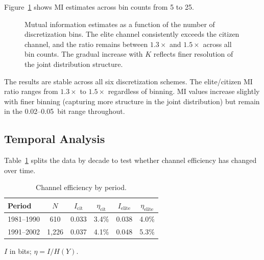 \documentclass[twocolumn,10pt]{article}
\begin{document}
Figure~\ref{fig:sensitivity} shows MI estimates across bin counts from 5 to 25.

\begin{figure}[t]
\centering
{}
\caption{Mutual information estimates as a function of the number of discretization bins.  The elite channel consistently exceeds the citizen channel, and the ratio remains between $1.3\times$ and $1.5\times$ across all bin counts.  The gradual increase with $K$ reflects finer resolution of the joint distribution structure.}
\label{fig:sensitivity}
\end{figure}

The results are stable across all six discretization schemes.  The elite/citizen MI ratio ranges from $1.3\times$ to $1.5\times$ regardless of binning.  MI values increase slightly with finer binning (capturing more structure in the joint distribution) but remain in the 0.02--0.05~bit range throughout.

\subsection{Temporal Analysis}

Table~\ref{tab:temporal} splits the data by decade to test whether channel efficiency has changed over time.

\begin{table}[t]
\centering
\caption{Channel efficiency by period.}
\label{tab:temporal}
\begin{tabular}{@{}lccccc@{}}
\toprule
Period & $N$ & $I_\text{cit}$ & $\eta_\text{cit}$ & $I_\text{elite}$ & $\eta_\text{elite}$ \\
\midrule
1981--1990 & 610 & 0.033 & 3.4\% & 0.038 & 4.0\% \\
1991--2002 & 1,226 & 0.037 & 4.1\% & 0.048 & 5.3\% \\
\bottomrule
\end{tabular}
\smallskip

\footnotesize{$I$ in bits; $\eta = I/H(Y)$.}
\end{table}
\end{document}
